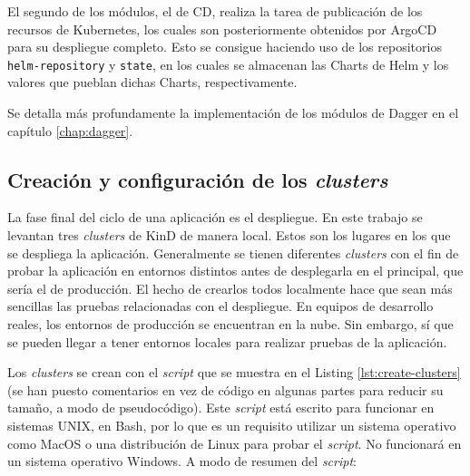 El segundo de los módulos, el de CD, realiza la tarea de publicación de los recursos de Kubernetes, los cuales son posteriormente obtenidos por ArgoCD para su despliegue completo. Esto se consigue haciendo uso de los repositorios \texttt{helm-repository} y \texttt{state}, en los cuales se almacenan las Charts de Helm y los valores que pueblan dichas Charts, respectivamente.

Se detalla más profundamente la implementación de los módulos de Dagger en el capítulo \ref{chap:dagger}.

\subsection*{Creación y configuración de los \textit{clusters}}
\label{subsec:clusters}

La fase final del ciclo de una aplicación es el despliegue. En este trabajo se levantan tres \textit{clusters} de KinD de manera local. Estos son los lugares en los que se despliega la aplicación. Generalmente se tienen diferentes \textit{clusters} con el fin de probar la aplicación en entornos distintos antes de desplegarla en el principal, que sería el de producción. El hecho de crearlos todos localmente hace que sean más sencillas las pruebas relacionadas con el despliegue. En equipos de desarrollo reales, los entornos de producción se encuentran en la nube. Sin embargo, sí que se pueden llegar a tener entornos locales para realizar pruebas de la aplicación.

Los \textit{clusters} se crean con el \textit{script} que se muestra en el Listing \ref{lst:create-clusters} (se han puesto comentarios en vez de código en algunas partes para reducir su tamaño, a modo de pseudocódigo). Este \textit{script} está escrito para funcionar en sistemas UNIX, en Bash, por lo que es un requisito utilizar un sistema operativo como MacOS o una distribución de Linux para probar el \textit{script}. No funcionará en un sistema operativo Windows. A modo de resumen del \textit{script}:

